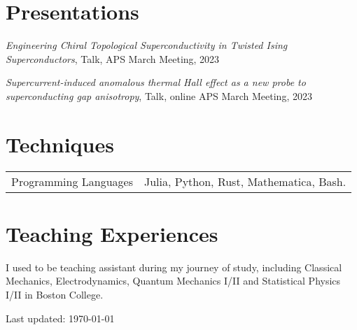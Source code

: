 \documentclass{article}
\renewenvironment{itemize}{
  \begin{list}{}{
    \setlength{\leftmargin}{1.5em}
  }
}{
  \end{list}
}
\begin{document}
\section*{Presentations}
\begin{itemize}
    \item \emph{Engineering Chiral Topological Superconductivity in Twisted Ising Superconductors}, Talk, APS March Meeting, 2023
    \item \emph{Supercurrent-induced anomalous thermal Hall effect as a new probe to superconducting gap anisotropy}, Talk, online APS March Meeting, 2023
\end{itemize}

\section*{Techniques}
    \begin{tabular}{ll}
        Programming Languages & Julia, Python, Rust, Mathematica, Bash.
    \end{tabular}


\section*{Teaching Experiences}
    I used to be teaching assistant during my journey of study, including Classical Mechanics, Electrodynamics, Quantum Mechanics I/II and Statistical Physics I/II in Boston College.


\begin{center}
  \begin{footnotesize}
    Last updated: \today 
  \end{footnotesize}
\end{center}
\end{document}
